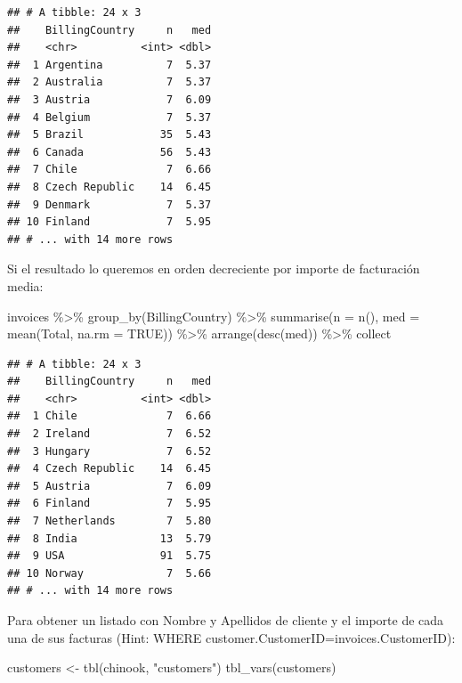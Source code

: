 \documentclass[
]{book}
\newenvironment{Shaded}{\begin{snugshade}}{\end{snugshade}}
\newcommand{\AttributeTok}[1]{\textcolor[rgb]{0.77,0.63,0.00}{#1}}
\newcommand{\ConstantTok}[1]{\textcolor[rgb]{0.00,0.00,0.00}{#1}}
\newcommand{\FunctionTok}[1]{\textcolor[rgb]{0.00,0.00,0.00}{#1}}
\newcommand{\NormalTok}[1]{#1}
\newcommand{\OtherTok}[1]{\textcolor[rgb]{0.56,0.35,0.01}{#1}}
\newcommand{\SpecialCharTok}[1]{\textcolor[rgb]{0.00,0.00,0.00}{#1}}
\newcommand{\StringTok}[1]{\textcolor[rgb]{0.31,0.60,0.02}{#1}}
\theoremstyle{break}
\theoremstyle{nonumberplain}
\begin{document}
\begin{verbatim}
## # A tibble: 24 x 3
##    BillingCountry     n   med
##    <chr>          <int> <dbl>
##  1 Argentina          7  5.37
##  2 Australia          7  5.37
##  3 Austria            7  6.09
##  4 Belgium            7  5.37
##  5 Brazil            35  5.43
##  6 Canada            56  5.43
##  7 Chile              7  6.66
##  8 Czech Republic    14  6.45
##  9 Denmark            7  5.37
## 10 Finland            7  5.95
## # ... with 14 more rows
\end{verbatim}

Si el resultado lo queremos en orden decreciente por importe de facturación media:

\begin{Shaded}
\begin{Highlighting}[]
\NormalTok{invoices }\SpecialCharTok{\%\textgreater{}\%} \FunctionTok{group\_by}\NormalTok{(BillingCountry) }\SpecialCharTok{\%\textgreater{}\%} 
          \FunctionTok{summarise}\NormalTok{(}\AttributeTok{n =} \FunctionTok{n}\NormalTok{(), }\AttributeTok{med =} \FunctionTok{mean}\NormalTok{(Total, }\AttributeTok{na.rm =} \ConstantTok{TRUE}\NormalTok{)) }\SpecialCharTok{\%\textgreater{}\%}
          \FunctionTok{arrange}\NormalTok{(}\FunctionTok{desc}\NormalTok{(med)) }\SpecialCharTok{\%\textgreater{}\%}\NormalTok{ collect}
\end{Highlighting}
\end{Shaded}

\begin{verbatim}
## # A tibble: 24 x 3
##    BillingCountry     n   med
##    <chr>          <int> <dbl>
##  1 Chile              7  6.66
##  2 Ireland            7  6.52
##  3 Hungary            7  6.52
##  4 Czech Republic    14  6.45
##  5 Austria            7  6.09
##  6 Finland            7  5.95
##  7 Netherlands        7  5.80
##  8 India             13  5.79
##  9 USA               91  5.75
## 10 Norway             7  5.66
## # ... with 14 more rows
\end{verbatim}

Para obtener un listado con Nombre y Apellidos de cliente y el importe de cada una de sus facturas (Hint: WHERE customer.CustomerID=invoices.CustomerID):

\begin{Shaded}
\begin{Highlighting}[]
\NormalTok{customers }\OtherTok{\textless{}{-}} \FunctionTok{tbl}\NormalTok{(chinook, }\StringTok{"customers"}\NormalTok{)}
\FunctionTok{tbl\_vars}\NormalTok{(customers) }
\end{Highlighting}
\end{Shaded}
\end{document}
